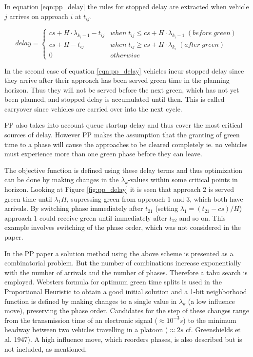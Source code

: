 In equation \ref{eqn:pp_delay} the rules for stopped delay are extracted when vehicle $j$ arrives on approach $i$ at $t_{ij}$.

\begin{equation}
delay = 
\begin{cases}
cs + H \cdot \lambda_{k_i-1} - t_{ij} & when \; t_{ij} \leq cs + H \cdot \lambda_{k_i-1} \; (before\;green)  \\
cs + H - t_{ij} & when \; t_{ij} \geq cs + H \cdot \lambda_{k_i} \; (after\;green)  \\
0 & otherwise
\end{cases}
\label{eqn:pp_delay}
\end{equation}

In the second case of equation \ref{eqn:pp_delay} vehicles incur stopped delay since they arrive after their approach has been served green time in the planning horizon. Thus they will not be served before the next green, which has not yet been planned, and stopped delay is accumulated until then. This is called carryover since vehicles are carried over into the next cycle.

PP also takes into account queue startup delay and thus cover the most critical sources of delay. However PP makes the assumption that the granting of green time to a phase will cause the approaches to be cleared completely ie. no vehicles must experience more than one green phase before they can leave.

The objective function is defined using these delay terms and thus optimization can be done by making changes in the $\lambda_k$-values within some critical points in horizon. Looking at Figure \ref{fig:pp_delay} it is seen that approach 2 is served green time until $\lambda_1 H$, supressing green from approach 1 and 3, which both have arrivals. By switching phase immediately after $t_{21}$ (setting $\lambda_1 = (t_{21} - cs)/H$) approach 1 could receive green until immediately after $t_{12}$ and so on. This example involves switching of the phase order, which was not considered in the paper.

In the PP paper \cite{1} a solution method using the above scheme is presented as a combinatorial problem. But the number of combinations increase exponentially with the number of arrivals and the number of phases. Therefore a tabu search is employed. Websters formula for optimum green time splits is used in the Proportional Heuristic to obtain a good initial solution and a 1-bit neighborhood function is defined by making changes to a single value in $\lambda_k$ (a low influence move), preserving the phase order. Candidates for the step of these changes range from the transmission time of an electronic signal ($\approx 10^{-3}s$) to the minimum headway between two vehicles travelling in a platoon ($\approx 2s$ cf. Greenshields et al. 1947).
A high influence move, which reorders phases, is also described but is not included, as mentioned.


